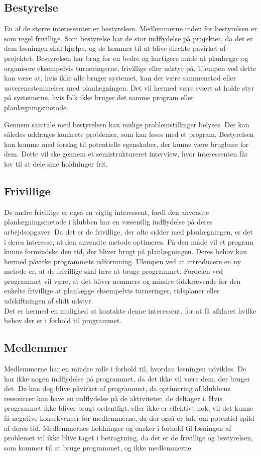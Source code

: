 \subsection*{Bestyrelse}
En af de større interessenter er bestyrelsen. Medlemmerne inden for bestyrelsen er som regel frivillige. Som bestyrelse har de stor indflydelse på projektet, da det er dem løsningen skal hjælpe, og de kommer til at blive direkte påvirket af projektet. Bestyrelsen har brug for en bedre og hurtigere måde at planlægge og organisere eksempelvis turneringerne, frivillige eller udstyr på. Ulempen ved dette kan være at, hvis ikke alle bruger systemet, kan der være sammenstød eller uoverensstemmelser med planlægningen. Det vil hermed være svært at holde styr på systemerne, hvis folk ikke bruger det samme program eller planlægningsmetode.
\par 
Gennem samtale med bestyrelsen kan mulige problemstillinger belyses. Der kan således uddrages konkrete problemer, som kan løses med et program. Bestyrelsen kan komme med forslag til potentielle egenskaber, der kunne være brugbare for dem. Dette vil ske gennem et semistruktureret interview, hvor interessenten får lov til at dele sine holdninger frit.

\subsection*{Frivillige}
De andre frivillige er også en vigtig interessent, fordi den anvendte planlægningsmetode i klubben har en væsentlig indflydelse på deres arbejdsopgaver. Da det er de frivillige, der ofte sidder med planlægningen, er det i deres interesse, at den anvendte metode optimeres. På den måde vil et program kunne formindske den tid, der bliver brugt på planlægningen. Deres behov kan hermed påvirke programmets udformning. Ulempen ved at introducere en ny metode er, at de frivillige skal lære at bruge programmet. Fordelen ved programmet vil være, at det bliver nemmere og mindre tidskrævende for den enkelte frivillige at planlægge eksempelvis turneringer, tidsplaner eller udskiftningen af slidt udstyr.\\
Det er hermed en mulighed at kontakte denne interessent, for at få afklaret hvilke behov der er i forhold til programmet.

\subsection*{Medlemmer}
Medlemmerne har en mindre rolle i forhold til, hvordan løsningen udvikles. De har ikke nogen indflydelse på programmet, da det ikke vil være dem, der bruger det. De kan dog blive påvirket af programmet, da optimering af klubbens ressourcer kan have en indflydelse på de aktiviteter, de deltager i. Hvis programmet ikke bliver brugt ordentligt, eller ikke er effektivt nok, vil det kunne få negative konsekvenser for medlemmerne, da der også er tale om potentiel spild af deres tid. Medlemmernes holdninger og ønsker i forhold til løsningen af problemet vil ikke blive taget i betragtning, da det er de frivillige og bestyrelsen, som kommer til at bruge programmet, og ikke medlemmerne.

